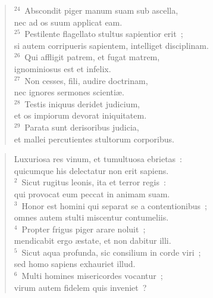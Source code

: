 \begin{flushleft}\begin{verse}${}^{24}$~Abscondit piger manum suam sub ascella,\\ nec ad os suum applicat eam.\\
${}^{25}$~Pestilente flagellato stultus sapientior erit~;\\ si autem corripueris sapientem, intelliget disciplinam.\\
${}^{26}$~Qui affligit patrem, et fugat matrem,\\ ignominiosus est et infelix.\\
${}^{27}$~Non cesses, fili, audire doctrinam,\\ nec ignores sermones scienti\ae .\\
${}^{28}$~Testis iniquus deridet judicium,\\ et os impiorum devorat iniquitatem.\\
${}^{29}$~Parata sunt derisoribus judicia,\\ et mallei percutientes stultorum corporibus.\end{verse}\end{flushleft}


\begin{flushleft}\begin{verse}\vspace{-19pt}\hspace{6pt}Luxuriosa res vinum, et tumultuosa ebrietas~:\\\hspace{6pt} quicumque his delectatur non erit sapiens.\\
${}^{2}$~Sicut rugitus leonis, ita et terror regis~:\\ qui provocat eum peccat in animam suam.\\
${}^{3}$~Honor est homini qui separat se a contentionibus~;\\ omnes autem stulti miscentur contumeliis.\\
${}^{4}$~Propter frigus piger arare noluit~;\\ mendicabit ergo \ae state, et non dabitur illi.\\
${}^{5}$~Sicut aqua profunda, sic consilium in corde viri~;\\ sed homo sapiens exhauriet illud.\\
${}^{6}$~Multi homines misericordes vocantur~;\\ virum autem fidelem quis inveniet~?\end{verse}\end{flushleft}


